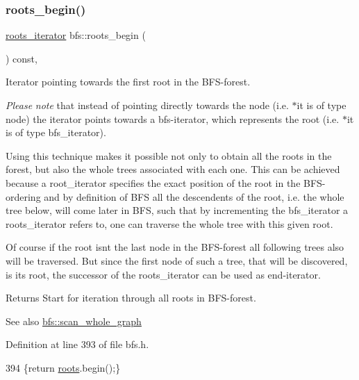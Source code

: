 \subsubsection{\texorpdfstring{roots\+\_\+begin()}{roots\_begin()}}
{\footnotesize\ttfamily \mbox{\hyperlink{classbfs_a70b915179053a2993154614d4358fdc1}{roots\+\_\+iterator}} bfs\+::roots\+\_\+begin (\begin{DoxyParamCaption}{ }\end{DoxyParamCaption}) const\hspace{0.3cm}{\ttfamily [inline]}, {\ttfamily [inherited]}}



Iterator pointing towards the first root in the B\+F\+S-\/forest. 

{\itshape Please} {\itshape note} that instead of pointing directly towards the node (i.\+e. {\ttfamily $\ast$it} is of type {\ttfamily node}) the iterator points towards a bfs-\/iterator, which represents the root (i.\+e. {\ttfamily $\ast$it} is of type {\ttfamily bfs\+\_\+iterator}).

Using this technique makes it possible not only to obtain all the roots in the forest, but also the whole trees associated with each one. This can be achieved because a {\ttfamily root\+\_\+iterator} specifies the exact position of the root in the B\+F\+S-\/ordering and by definition of B\+FS all the descendents of the root, i.\+e. the whole tree below, will come later in B\+FS, such that by incrementing the {\ttfamily bfs\+\_\+iterator} a {\ttfamily roots\+\_\+iterator} refers to, one can traverse the whole tree with this given root.

Of course if the root isn\textquotesingle{}t the last node in the B\+F\+S-\/forest all following trees also will be traversed. But since the first node of such a tree, that will be discovered, is its root, the successor of the {\ttfamily roots\+\_\+iterator} can be used as end-\/iterator.

\begin{DoxyReturn}{Returns}
Start for iteration through all roots in B\+F\+S-\/forest. 
\end{DoxyReturn}
\begin{DoxySeeAlso}{See also}
\mbox{\hyperlink{classbfs_a25fc51b1bfbbdd3afefe0a84c1bd2f6b}{bfs\+::scan\+\_\+whole\+\_\+graph}} 
\end{DoxySeeAlso}


Definition at line 393 of file bfs.\+h.


\begin{DoxyCode}
394     \{\textcolor{keywordflow}{return} \mbox{\hyperlink{classbfs_acea071a6fdad8e590b40830ced241824}{roots}}.begin();\}
\end{DoxyCode}
\mbox{\label{classbfs_ac84b90f777adeb90390689db62602d73}} 
